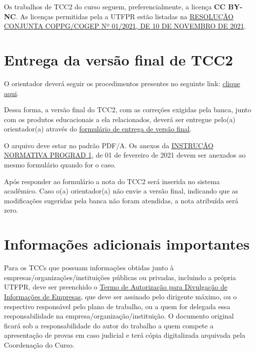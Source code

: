 \documentclass[a4paper, 12pt]{article}
\begin{document}
	Os trabalhos de TCC2 do curso seguem, preferencialmente, a licença \textbf{CC BY-NC}. As licenças permitidas pela a UTFPR estão listadas na \href{https://sei.utfpr.edu.br/sei/publicacoes/controlador_publicacoes.php?acao=publicacao_visualizar&id_documento=2615190&id_orgao_publicacao=0}{RESOLUÇÃO CONJUNTA COPPG/COGEP Nº 01/2021, DE 10 DE NOVEMBRO DE 2021}.
	
	\section{Entrega da versão final de TCC2}
	
	O orientador deverá seguir os procedimentos presentes no seguinte link: \href{http://portal.utfpr.edu.br/biblioteca/trabalhos-academicos/docentes/procedimento-de-entrega-graduacao}{clique aqui}.
	
	Dessa forma, a versão final do TCC2, com as correções exigidas pela banca, junto com os produtos educacionais a ela relacionados, deverá ser entregue pelo(a) orientador(a) através do \href{https://forms.gle/LScHkAtDPReTjki46}{formulário de entrega de versão final}. 
	
	O arquivo deve estar no padrão PDF/A. Os anexos da \href{https://sei.utfpr.edu.br/sei/publicacoes/controlador_publicacoes.php?acao=publicacao_visualizar&id_documento=2042165&id_orgao_publicacao=0}{INSTRUÇÃO NORMATIVA PROGRAD 1}, de 01 de fevereiro de 2021 devem ser anexados ao mesmo formulário quando for o caso. 
		
	Após responder ao formulário a nota do TCC2 será inserida no sistema acadêmico. Caso o(a) orientador(a) não envie a versão final, indicando que as modificações sugeridas pela banca não foram atendidas, a nota atribuída será zero.	
		
	\section{Informações adicionais importantes}
	
	Para os TCCs que possuam informações obtidas junto à empresas/organizações/instituições públicas ou privadas, incluindo a própria UTFPR, deve ser preenchido o \href{https://sei.utfpr.edu.br/sei/publicacoes/controlador_publicacoes.php?acao=publicacao_visualizar&id_documento=2651593&id_orgao_publicacao=0}{Termo de Autorização para Divulgação de Informações de Empresas}, que deve ser assinado pelo dirigente máximo, ou o respectivo responsável pelo plano de trabalho, ou a quem for delegada essa responsabilidade na empresa/organização/instituição. O documento original ficará sob a responsabilidade do autor do trabalho a quem compete a apresentação de provas em caso judicial e terá cópia digitalizada arquivada pela Coordenação do Curso.
\end{document}
